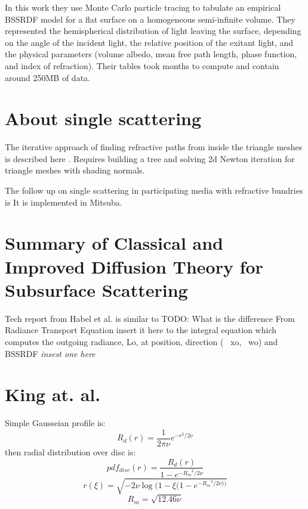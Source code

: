 In this work they use Monte Carlo particle tracing to tabulate an empirical
BSSRDF model for a flat surface on a homogeneous semi-infinite volume.
They represented the hemispherical distribution of light leaving the surface,
depending on the angle of the incident light, the relative position of the
exitant light, and the physical parameters (volume albedo, mean free path
length, phase function, and index of refraction). Their tables took months to
compute and contain around 250MB of data.

\section{About single scattering}
The iterative approach of finding refractive paths from inside the triangle
meshes is described here \cite{walter:inria-00388481}. Requires building a tree
and solving 2d Newton iteration for triangle meshes with shading normals.

The follow up on single scattering in participating media with refractive
bundries is \cite{holzschuch:hal-01083246} It is implemented in Mitsuba.

\section{Summary of \textbf{Classical and Improved Diffusion Theory for
Subsurface Scattering}}
Tech report from Habel et al. \cite{habel13cid} is similar to \cite{Habel:2013:PBD:2600890.2600896}
TODO: What is the difference
From Radiance Transport Equation {insert it here} to the integral equation which
computes the outgoing radiance, Lo, at position, direction (~ xo,~ wo) and
BSSRDF \textit{insest one here}

\section{King at. al.}
Simple Gausseian profile is:
\[
R_d(r) = \dfrac{1}{2\pi \nu}e^{-r^2/2\nu}
\]
then radial distribution over disc is:
\[
pdf_{disc}(r) = \dfrac{R_d(r)}{1-e^{-{R_m}^2/2 \nu}}
\]
\[
r(\xi) = \sqrt{-2\nu \log(1-\xi(1-e^{-{R_m}^2/2 \nu))}}
\]
\[
R_m = \sqrt{12.46\nu}
\]


